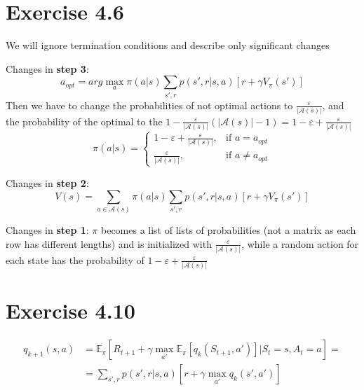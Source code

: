 \documentclass[12pt]{article}
\begin{document}
    \section{Exercise 4.6}
        We will ignore termination conditions and describe only significant changes

        Changes in \textbf{step 3}:
            $$a_{opt} = arg\max\limits_a \pi(a|s)\sum\limits_{s',r} p(s',r|s,a)
            [r + \gamma V_\pi(s')]$$
            Then we have to change the probabilities of not optimal actions to
            $\frac{\varepsilon}{|\mathcal{A}(s)|}$, and the probability of the optimal
            to the $1 - \frac{\varepsilon}{|\mathcal{A}(s)|}(|\mathcal{A}(s)| -1) =
            1 - \varepsilon + \frac{\varepsilon}{|\mathcal{A}(s)|}$
            \[
                \pi(a|s) =
                \begin{cases}
                    1 - \varepsilon + \frac{\varepsilon}{|\mathcal{A}(s)|}, & \text{if } a = a_{opt} \\
                    \frac{\varepsilon}{|\mathcal{A}(s)|}, & \text{if } a \neq a_{opt}
                \end{cases}
            \]

        Changes in \textbf{step 2}:
            $$V(s) = \sum\limits_{a \in \mathcal{A}(s)} \pi(a|s)\sum\limits_{s',r} p(s',r|s,a)
            [r + \gamma V_\pi(s')]$$

        Changes in \textbf{step 1}: $\pi$ becomes a list of lists of probabilities
        (not a matrix as each row has different lengths) and is initialized with
        $\frac{\varepsilon}{|\mathcal{A}(s)|}$, while a random action for each
        state has the probability of $1 - \varepsilon + \frac{\varepsilon}{|\mathcal{A}(s)|}$

    \section{Exercise 4.10}
        \begin{align*}
            q_{k+1}(s,a) &= \mathbb{E}_\pi[R_{t+1} +
            \gamma \max\limits_{a'} \mathbb{E}_\pi[q_k(S_{t+1},a')]
            |S_t=s,A_t=a] =\\
            &= \sum\limits_{s',r} p(s',r|s,a)[r +
            \gamma \max\limits_{a'} q_k(s',a')]
        \end{align*}
\end{document}
